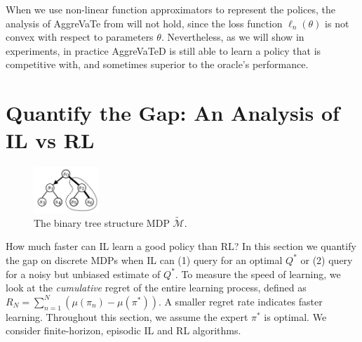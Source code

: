 \documentclass{article}
\begin{document}
When we use non-linear function approximators to represent the polices, the analysis of AggreVaTe from \cite{ross2014reinforcement} will not hold, since the loss function $\ell_n(\theta)$ is not convex with respect to parameters $\theta$. Nevertheless, as we will show in experiments, in practice AggreVaTeD is still able to learn a policy that is competitive with, and sometimes superior to the oracle's performance.  




\section{Quantify the Gap: An Analysis of IL vs RL}
\begin{figure}
  \centering
      \includegraphics[trim={1cm 0.5cm 0 1cm},clip, width=0.22\textwidth]{./figure/binary_tree_MDP}
  \caption{The binary tree structure MDP $\tilde{\mathcal{M}}$. %
  }
  \label{fig:binary_MDP}
  \vspace{-5pt}
\end{figure}
How much faster can IL learn a good policy than RL? In this section we quantify the gap on discrete MDPs when IL can (1) query for an {optimal} $Q^*$ or (2) query for a noisy but unbiased estimate of $Q^*$. To measure the speed of learning, we look at the \emph{cumulative} regret of the entire learning process, defined as $R_N = \sum_{n=1}^N (\mu(\pi_n) - \mu(\pi^*))$. A smaller regret rate indicates faster learning. Throughout this section, we assume the expert $\pi^*$ is optimal. We consider finite-horizon, episodic IL and RL algorithms. 
\end{document}
